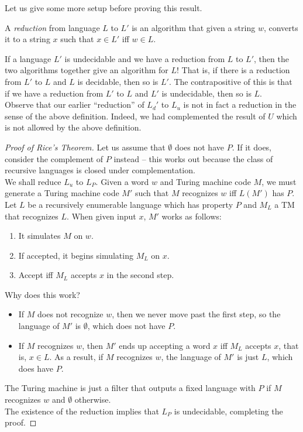 	Let us give some more setup before proving this result.

	\begin{fdef}[Reduction]
		A \emph{reduction} from language $L$ to $L'$ is an algorithm that given a string $w$, converts it to a string $x$ such that $x \in L'$ iff $w \in L$.
	\end{fdef}

	If a language $L'$ is undecidable and we have a reduction from $L$ to $L'$, then the two algorithms together give an algorithm for $L$! That is, if there is a reduction from $L'$ to $L$ and $L$ is decidable, then so is $L'$. The contrapositive of this is that if we have a reduction from $L'$ to $L$ and $L'$ is undecidable, then so is $L$. \\
	Observe that our earlier ``reduction'' of $L_d'$ to $L_u$ is not in fact a reduction in the sense of the above definition. Indeed, we had complemented the result of $U$ which is not allowed by the above definition.

	\begin{proof}[Proof of Rice's Theorem]
		Let us assume that $\emptyset$ does not have $P$. If it does, consider the complement of $P$ instead -- this works out because the class of recursive languages is closed under complementation.\\
		We shall reduce $L_u$ to $L_P$. Given a word $w$ and Turing machine code $M$, we must generate a Turing machine code $M'$ such that $M$ recognizes $w$ iff $L(M')$ has $P$. \\
		Let $L$ be a recursively enumerable language which has property $P$ and $M_L$ a TM that recognizes $L$.
		When given input $x$, $M'$ works as follows:
		\begin{enumerate}
			\item It simulates $M$ on $w$.
			\item If accepted, it begins simulating $M_L$ on $x$.
			\item Accept iff $M_L$ accepts $x$ in the second step.
		\end{enumerate}
		Why does this work?
		\begin{itemize}
			\item If $M$ does not recognize $w$, then we never move past the first step, so the language of $M'$ is $\emptyset$, which does not have $P$.
			\item If $M$ recognizes $w$, then $M'$ ends up accepting a word $x$ iff $M_L$ accepts $x$, that is, $x \in L$. As a result, if $M$ recognizes $w$, the language of $M'$ is just $L$, which does have $P$.
		\end{itemize}
		The Turing machine is just a filter that outputs a fixed language with $P$ if $M$ recognizes $w$ and $\emptyset$ otherwise.\\
		The existence of the reduction implies that $L_P$ is undecidable, completing the proof.
	\end{proof}

